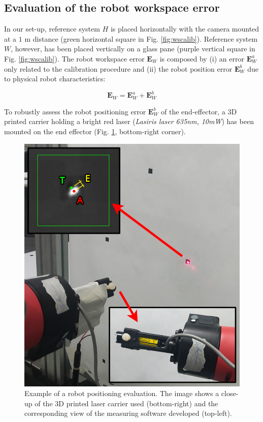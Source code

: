 \documentclass[a4paper, 10 pt, conference]{ieeeconf}      %
\begin{document}
\subsection{Evaluation of the robot workspace error}

In our set-up, reference system $H$ is placed horizontally with the camera mounted at a $1$ m distance (green horizontal square in Fig. \ref{fig:wscalib}). Reference system $W$, however, has been placed vertically on a glass pane (purple vertical square in Fig. \ref{fig:wscalib}).
The robot workspace error $\mathbf{E}_{W}$ is composed by (i) an error $\mathbf{E}^a_{W}$ only related to the calibration procedure and (ii) the robot position error $\mathbf{E}^b_{W}$ due to physical robot characteristics:

\begin{equation}
\mathbf{E}_{W} = \mathbf{E}^a_{W} + \mathbf{E}^b_{W}
\end{equation} 

To robustly assess the robot positioning error $\mathbf{E}^b_{W}$ of the end-effector, a 3D printed carrier holding a bright red laser (\textit{Lasiris laser 635nm, 10mW}) has been mounted on the end effector (Fig. \ref{fig:laser}, bottom-right corner).

\begin{figure} [ht]
  \centering
  \includegraphics[width=0.7\columnwidth]{figures/lasermount}
  \caption{Example of a robot positioning evaluation. The image shows a close-up of the 3D printed laser carrier used (bottom-right) and the corresponding view of the measuring software developed (top-left).}
  \label{fig:laser}
\end{figure}
\end{document}
